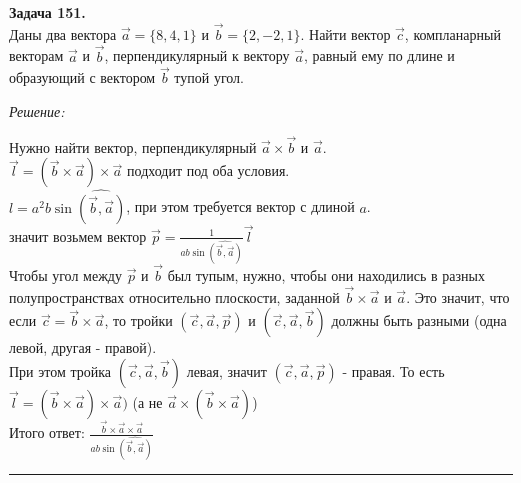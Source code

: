 \documentclass[a4paper, 12pt]{article}
\newenvironment{problem}[2][Задача]
    { \begin{mdframed}[backgroundcolor=gray!10] \textbf{#1 #2.} \\}
    {  \end{mdframed}}
\newenvironment{solution}
    {\textit{Решение: }}
    {\noindent\rule{7in}{1.5pt}}
\begin{document}
\begin{problem}{151}
Даны два вектора $\vec{a}=\{8,4,1\}$ и $\vec{b}=\{2,-2,1\}$. Найти вектор $\vec c$, компланарный векторам $\vec a$ и $\vec b$,
перпендикулярный к вектору $\vec a$, равный ему по длине и образующий с вектором $\vec b$ тупой угол.
\end{problem}
\begin{solution}

Нужно найти вектор, перпендикулярный $\vec{a} \times \vec{b}$ и $\vec{a}$. \\
$\vec{l} = (\vec{b} \times \vec{a}) \times \vec{a}$ подходит под оба условия. \\
$l = a^2b\sin{\hat{(\overrightarrow{b}, \overrightarrow{a})}}$, при этом требуется вектор с длиной $a$. \\
значит возьмем вектор $\vec{p}=\frac{1}{ab\sin{\hat{(\overrightarrow{b}, \overrightarrow{a})}}}\vec{l}$ \\
Чтобы угол между $\vec{p}$ и $\vec{b}$ был тупым, нужно, чтобы они находились в разных полупространствах относительно плоскости, заданной $\vec{b} \times \vec{a}$ и $\vec{a}$.
Это значит, что если $\vec{c} = \vec{b} \times \vec{a}$, то тройки $(\vec{c}, \vec{a}, \vec{p})$ и $(\vec{c}, \vec{a}, \vec{b})$ должны быть разными (одна левой, другая - правой). \\
При этом тройка $(\vec{c}, \vec{a}, \vec{b})$ левая,
значит $(\vec{c}, \vec{a}, \vec{p})$ - правая.
То есть $\vec{l}=(\vec{b} \times \vec{a}) \times \vec{a})$
(а не $\vec{a} \times (\vec{b} \times \vec{a})$) \\

Итого ответ: $\frac{\vec{b} \times \vec{a} \times \vec{a}}{ab\sin{\hat{(\overrightarrow{b}, \overrightarrow{a})}}}$

\end{solution}
\end{document}
